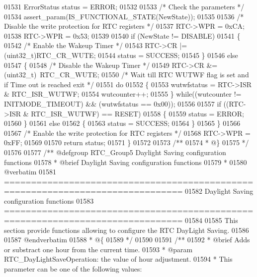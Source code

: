 \begin{DoxyCode}
01531   ErrorStatus status = ERROR;
01532 
01533   \textcolor{comment}{/* Check the parameters */}
01534   assert_param(IS\_FUNCTIONAL\_STATE(NewState));
01535 
01536   \textcolor{comment}{/* Disable the write protection for RTC registers */}
01537   RTC->WPR = 0xCA;
01538   RTC->WPR = 0x53;
01539 
01540   \textcolor{keywordflow}{if} (NewState != DISABLE)
01541   \{
01542     \textcolor{comment}{/* Enable the Wakeup Timer */}
01543     RTC->CR |= (uint32\_t)RTC_CR_WUTE;
01544     status = SUCCESS;
01545   \}
01546   \textcolor{keywordflow}{else}
01547   \{
01548     \textcolor{comment}{/* Disable the Wakeup Timer */}
01549     RTC->CR &= (uint32\_t)~RTC_CR_WUTE;
01550     \textcolor{comment}{/* Wait till RTC WUTWF flag is set and if Time out is reached exit */}
01551     \textcolor{keywordflow}{do}
01552     \{
01553       wutwfstatus = RTC->ISR & RTC_ISR_WUTWF;
01554       wutcounter++;
01555     \} \textcolor{keywordflow}{while}((wutcounter != INITMODE_TIMEOUT) && (wutwfstatus == 0x00));
01556 
01557     \textcolor{keywordflow}{if} ((RTC->ISR & RTC_ISR_WUTWF) == RESET)
01558     \{
01559       status = ERROR;
01560     \}
01561     \textcolor{keywordflow}{else}
01562     \{
01563       status = SUCCESS;
01564     \}
01565   \}
01566 
01567   \textcolor{comment}{/* Enable the write protection for RTC registers */}
01568   RTC->WPR = 0xFF;
01569 
01570   \textcolor{keywordflow}{return} status;
01571 \}
01572 
01573 \textcolor{comment}{/**}
01574 \textcolor{comment}{  * @\}}
01575 \textcolor{comment}{  */}
01576 
01577 \textcolor{comment}{/** @defgroup RTC\_Group5 Daylight Saving configuration functions}
01578 \textcolor{comment}{ *  @brief   Daylight Saving configuration functions }
01579 \textcolor{comment}{ *}
01580 \textcolor{comment}{@verbatim   }
01581 \textcolor{comment}{ ===============================================================================}
01582 \textcolor{comment}{                    Daylight Saving configuration functions}
01583 \textcolor{comment}{ ===============================================================================  }
01584 \textcolor{comment}{}
01585 \textcolor{comment}{  This section provide functions allowing to configure the RTC DayLight Saving.}
01586 \textcolor{comment}{}
01587 \textcolor{comment}{@endverbatim}
01588 \textcolor{comment}{  * @\{}
01589 \textcolor{comment}{  */}
01590 
01591 \textcolor{comment}{/**}
01592 \textcolor{comment}{  * @brief  Adds or substract one hour from the current time.}
01593 \textcolor{comment}{  * @param  RTC\_DayLightSaveOperation: the value of hour adjustment. }
01594 \textcolor{comment}{  *          This parameter can be one of the following values:}

\end{DoxyCode}
